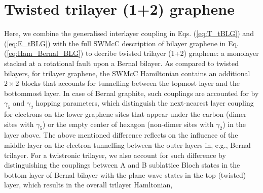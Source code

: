 \documentclass[showpacs,aps,prb,reprint,twocolumn]{revtex4-1}
\begin{document}
\section{Twisted trilayer (1+2) graphene}
\label{sec:dispersion_ttlg}
Here, we combine the generalised interlayer coupling in Eqs. (\ref{eq:T_tBLG}) and (\ref{eq:E_tBLG}) with the full SWMcC description of bilayer graphene in Eq. (\ref{eq:Ham_Bernal_BLG}) to decribe twisted trilayer (1+2) graphene: a monolayer stacked at a rotational fault upon a Bernal bilayer. As compared to twisted bilayers, for trilayer graphene, the SWMcC Hamiltonian contains an additional $2\times2$ blocks that accounts for tunnelling between the topmost layer and the bottommost layer\cite{Slonczewski_1958, McClure_1957, McClure_1960,Taychatanapat_2011}. In case of Bernal graphite, such couplings are accounted for by $\gamma_5$ and $\gamma_2$ hopping parameters, which distinguish the next-nearest layer coupling for electrons on the lower graphene sites that appear under the carbon (dimer sites with $\gamma_5$) or the empty center of hexagon (non-dimer sites with $\gamma_2$) in the layer above. The above mentioned difference reflects on the influence of the middle layer on the electron tunnelling between the outer layers in, e.g., Bernal trilayer. For a twistronic trilayer, we also account for such difference by distinguishing the couplings between A and B sublattice Bloch states in the bottom layer of Bernal bilayer with the plane wave states in the top (twisted) layer, which results in the overall trilayer Hamltonian,
\end{document}
